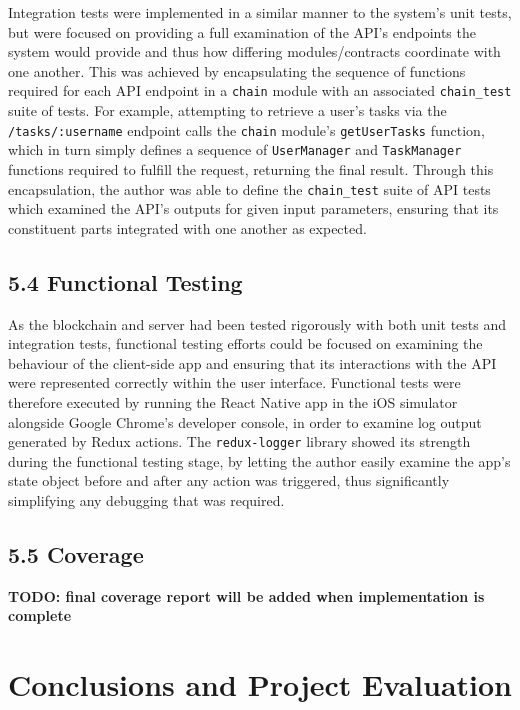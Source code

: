Integration tests were implemented in a similar manner to the system's
unit tests, but were focused on providing a full examination of the
API's endpoints the system would provide and thus how differing
modules/contracts coordinate with one another. This was achieved by
encapsulating the sequence of functions required for each API endpoint
in a \texttt{chain} module with an associated \texttt{chain\_test} suite
of tests. For example, attempting to retrieve a user's tasks via the
\texttt{/tasks/:username} endpoint calls the \texttt{chain} module's
\texttt{getUserTasks} function, which in turn simply defines a sequence
of \texttt{UserManager} and \texttt{TaskManager} functions required to
fulfill the request, returning the final result. Through this
encapsulation, the author was able to define the \texttt{chain\_test}
suite of API tests which examined the API's outputs for given input
parameters, ensuring that its constituent parts integrated with one
another as expected.

\section{5.4 Functional Testing}\label{functional-testing}

As the blockchain and server had been tested rigorously with both unit
tests and integration tests, functional testing efforts could be focused
on examining the behaviour of the client-side app and ensuring that its
interactions with the API were represented correctly within the user
interface. Functional tests were therefore executed by running the React
Native app in the iOS simulator alongside Google Chrome's developer
console, in order to examine log output generated by Redux actions. The
\texttt{redux-logger} library showed its strength during the functional
testing stage, by letting the author easily examine the app's state
object before and after any action was triggered, thus significantly
simplifying any debugging that was required.

\section{5.5 Coverage}\label{coverage}

\textbf{TODO: final coverage report will be added when implementation is
complete}

\chapter{Conclusions and Project
Evaluation}

